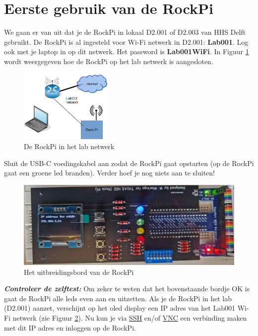 \section{Eerste gebruik van de RockPi}
We gaan er van uit dat je de RockPi in lokaal D2.001 of D2.003 van HHS Delft gebruikt. \newline
De RockPi is al ingesteld voor Wi-Fi netwerk in D2.001: \textbf{Lab001}. \newline
Log ook met je laptop in op dit netwerk. Het password is \textbf{Lab001WiFi}. \newline
In Figuur \ref{fig:netw} wordt weergegeven hoe de RockPi op het lab netwerk is aangesloten.
\begin{figure}[h!]
	\centering
	\begin{center} 	
		\includegraphics[width=0.4\textwidth]{figuren/laBnetwork}
		\caption{De RockPi in het lab netwerk}
		\label{fig:netw}   
	\end{center}
\end{figure}
\break
Sluit de USB-C voedingskabel aan zodat de RockPi gaat opstarten (op de RockPi gaat een groene led branden). Verder hoef je nog niets aan te sluiten!
\begin{figure}[h!]
	\centering
	\begin{center} 	
		\includegraphics[width=1\textwidth]{figuren/rockIPnr}
		\caption{Het uitbreidingsbord van de RockPi}
		\label{fig:rockIPnr}   
	\end{center}
\end{figure}

\textbf{\textit{Controleer de zelftest:}} Om zeker te weten dat het bovenstaande bordje OK is gaat de RockPi alle leds even aan en uitzetten. \newline
Als je de RockPi in het lab (D2.001) aanzet, verschijnt op het oled display 
een IP adres van het Lab001 Wi-Fi netwerk (zie Figuur \ref{fig:rockIPnr}). %
Nu kun je via \hyperlink{chp:ssh}{SSH} en/of \hyperlink{chp:vnc}{VNC} een verbinding maken met dit IP adres en inloggen op de RockPi.

